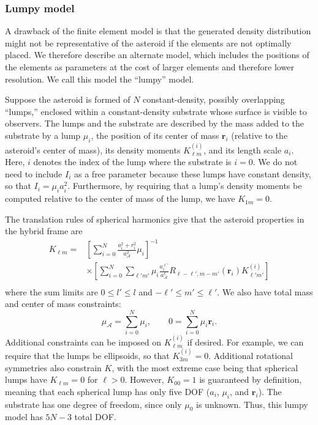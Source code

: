 \documentclass[fleqn,usenatbib]{mnras}
\newcommand{\brackets}[1]{\left[ #1 \right]}
\begin{document}
\subsubsection{Lumpy model}

A drawback of the finite element model is that the generated density distribution might not be representative of the asteroid if the elements are not optimally placed. We therefore describe an alternate model, which includes the positions of the elements as parameters at the cost of larger elements and therefore lower resolution. We call this model the ``lumpy'' model.

Suppose the asteroid is formed of $N$ constant-density, possibly overlapping ``lumps,'' enclosed within a constant-density substrate whose surface is visible to observers. The lumps and the substrate are described by the mass added to the substrate by a lump $\mu_i$, the position of its center of mass $\bm r_i$ (relative to the asteroid's center of mass), its density moments $K_{\ell m}^{(i)}$, and its length scale $a_i$. Here, $i$ denotes the index of the lump where the substrate is $i=0$.  We do not need to include $I_i$ as a free parameter because these lumps have constant density, so that $I_i = \mu_i a_i^2$. Furthermore, by requiring that a lump's density moments be computed relative to the center of mass of the lump, we have $K_{1m} = 0$.

The translation rules of spherical harmonics give that the asteroid properties in the hybrid frame are
\begin{equation}
  \begin{aligned}
    K_{\ell m} = &\brackets{\sum_{i=0}^N \frac{a_i^2 + r_i^2}
    {a_\mathcal{A}^2}\mu_i}^{-1} \\
    &\times \brackets{\sum_{i=0}^N \sum_{\ell' m'}\mu_i
    \frac{a_i^{\ell'}}{a_\mathcal{A}^\ell}
    R_{\ell - \ell', m - m'}(\bm r_i)K_{\ell' m'}^{(i)}} \\
  \end{aligned}
\end{equation}
where the sum limits are $0 \leq l' \leq l$ and $-\ell' \leq m' \leq \ell'$. We also have total mass and center of mass constraints:
\begin{equation}
  \mu_\mathcal{A} = \sum_{i=0}^N \mu_i,  \qquad 0 = \sum_{i=0}^N \mu_i \bm r_i.
\end{equation}
Additional constraints can be imposed on $K_{\ell m}^{(i)}$ if desired. For example, we can require that the lumps be ellipsoids, so that $K_{3 m}^{(i)} = 0$. Additional rotational symmetries also constrain $K$, with the most extreme case being that spherical lumps have $K_{\ell m} = 0$ for $\ell > 0$. However, $K_{00}=1$ is guaranteed by definition, meaning that each spherical lump has only five DOF ($a_i$, $\mu_i$, and $\bm r_i$). The substrate has one degree of freedom, since only $\mu_0$ is unknown. Thus, this lumpy model has $5N - 3$ total DOF.
\end{document}
